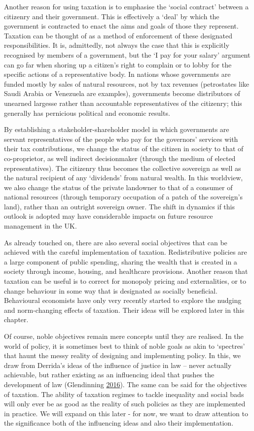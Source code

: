 \documentclass[]{tufte-handout}
\begin{document}
Another reason for using taxation is to emphasise the `social contract'
between a citizenry and their government. This is effectively a `deal'
by which the government is contracted to enact the aims and goals of
those they represent. Taxation can be thought of as a method of
enforcement of these designated responsibilities. It is, admittedly, not
always the case that this is explicitly recognised by members of a
government, but the `I pay for your salary' argument can go far when
shoring up a citizen's right to complain or to lobby for the specific
actions of a representative body. In nations whose governments are
funded mostly by sales of natural resources, not by tax revenues
(petrostates like Saudi Arabia or Venezuela are examples), governments
become distributors of unearned largesse rather than accountable
representatives of the citizenry; this generally has pernicious
political and economic results.

By establishing a stakeholder-shareholder model in which governments are
servant representatives of the people who pay for the governors'
services with their tax contributions, we change the status of the
citizen in society to that of co-proprietor, as well indirect
decisionmaker (through the medium of elected representatives). The
citizenry thus becomes the collective sovereign as well as the natural
recipient of any `dividends' from natural wealth. In this worldview, we
also change the status of the private landowner to that of a consumer of
national resources (through temporary occupation of a patch of the
sovereign's land), rather than an outright sovereign owner. The shift in
dynamics if this outlook is adopted may have considerable impacts on
future resource management in the UK.

As already touched on, there are also several social objectives that can
be achieved with the careful implementation of taxation. Redistributive
policies are a large component of public spending, sharing the wealth
that is created in a society through income, housing, and healthcare
provisions. Another reason that taxation can be useful is to correct for
monopoly pricing and externalities, or to change behaviour in some way
that is designated as socially beneficial. Behavioural economists have
only very recently started to explore the nudging and norm-changing
effects of taxation. Their ideas will be explored later in this chapter.

Of course, noble objectives remain mere concepts until they are
realised. In the world of policy, it is sometimes best to think of noble
goals as akin to `spectres' that haunt the messy reality of designing
and implementing policy. In this, we draw from Derrida's ideas of the
influence of justice in law -- never actually achievable, but rather
existing as an influencing ideal that pushes the development of law
(Glendinning \protect\hyperlink{ref-Glendinning2016}{2016}). The same
can be said for the objectives of taxation. The ability of taxation
regimes to tackle inequality and social bads will only ever be as good
as the reality of such policies as they are implemented in practice. We
will expand on this later - for now, we want to draw attention to the
significance both of the influencing ideas and also their
implementation.
\end{document}
